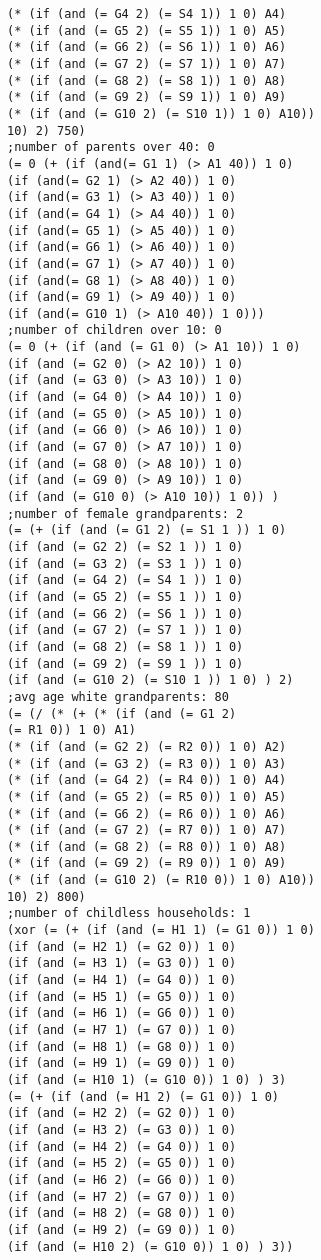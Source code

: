 \documentclass[5p,times,11pt]{elsarticle}
\begin{document}
\begin{verbatim}
(* (if (and (= G4 2) (= S4 1)) 1 0) A4)
(* (if (and (= G5 2) (= S5 1)) 1 0) A5)
(* (if (and (= G6 2) (= S6 1)) 1 0) A6)
(* (if (and (= G7 2) (= S7 1)) 1 0) A7)
(* (if (and (= G8 2) (= S8 1)) 1 0) A8)
(* (if (and (= G9 2) (= S9 1)) 1 0) A9)
(* (if (and (= G10 2) (= S10 1)) 1 0) A10))
10) 2) 750)
;number of parents over 40: 0
(= 0 (+ (if (and(= G1 1) (> A1 40)) 1 0)
(if (and(= G2 1) (> A2 40)) 1 0)
(if (and(= G3 1) (> A3 40)) 1 0)
(if (and(= G4 1) (> A4 40)) 1 0)
(if (and(= G5 1) (> A5 40)) 1 0)
(if (and(= G6 1) (> A6 40)) 1 0)
(if (and(= G7 1) (> A7 40)) 1 0)
(if (and(= G8 1) (> A8 40)) 1 0)
(if (and(= G9 1) (> A9 40)) 1 0)
(if (and(= G10 1) (> A10 40)) 1 0)))
;number of children over 10: 0
(= 0 (+ (if (and (= G1 0) (> A1 10)) 1 0)
(if (and (= G2 0) (> A2 10)) 1 0)
(if (and (= G3 0) (> A3 10)) 1 0)
(if (and (= G4 0) (> A4 10)) 1 0)
(if (and (= G5 0) (> A5 10)) 1 0)
(if (and (= G6 0) (> A6 10)) 1 0)
(if (and (= G7 0) (> A7 10)) 1 0)
(if (and (= G8 0) (> A8 10)) 1 0)
(if (and (= G9 0) (> A9 10)) 1 0)
(if (and (= G10 0) (> A10 10)) 1 0)) )
;number of female grandparents: 2
(= (+ (if (and (= G1 2) (= S1 1 )) 1 0)
(if (and (= G2 2) (= S2 1 )) 1 0)
(if (and (= G3 2) (= S3 1 )) 1 0)
(if (and (= G4 2) (= S4 1 )) 1 0)
(if (and (= G5 2) (= S5 1 )) 1 0)
(if (and (= G6 2) (= S6 1 )) 1 0)
(if (and (= G7 2) (= S7 1 )) 1 0)
(if (and (= G8 2) (= S8 1 )) 1 0)
(if (and (= G9 2) (= S9 1 )) 1 0)
(if (and (= G10 2) (= S10 1 )) 1 0) ) 2)
;avg age white grandparents: 80
(= (/ (* (+ (* (if (and (= G1 2)
(= R1 0)) 1 0) A1)
(* (if (and (= G2 2) (= R2 0)) 1 0) A2)
(* (if (and (= G3 2) (= R3 0)) 1 0) A3)
(* (if (and (= G4 2) (= R4 0)) 1 0) A4)
(* (if (and (= G5 2) (= R5 0)) 1 0) A5)
(* (if (and (= G6 2) (= R6 0)) 1 0) A6)
(* (if (and (= G7 2) (= R7 0)) 1 0) A7)
(* (if (and (= G8 2) (= R8 0)) 1 0) A8)
(* (if (and (= G9 2) (= R9 0)) 1 0) A9)
(* (if (and (= G10 2) (= R10 0)) 1 0) A10))
10) 2) 800)
;number of childless households: 1
(xor (= (+ (if (and (= H1 1) (= G1 0)) 1 0)
(if (and (= H2 1) (= G2 0)) 1 0)
(if (and (= H3 1) (= G3 0)) 1 0)
(if (and (= H4 1) (= G4 0)) 1 0)
(if (and (= H5 1) (= G5 0)) 1 0)
(if (and (= H6 1) (= G6 0)) 1 0)
(if (and (= H7 1) (= G7 0)) 1 0)
(if (and (= H8 1) (= G8 0)) 1 0)
(if (and (= H9 1) (= G9 0)) 1 0)
(if (and (= H10 1) (= G10 0)) 1 0) ) 3)
(= (+ (if (and (= H1 2) (= G1 0)) 1 0)
(if (and (= H2 2) (= G2 0)) 1 0)
(if (and (= H3 2) (= G3 0)) 1 0)
(if (and (= H4 2) (= G4 0)) 1 0)
(if (and (= H5 2) (= G5 0)) 1 0)
(if (and (= H6 2) (= G6 0)) 1 0)
(if (and (= H7 2) (= G7 0)) 1 0)
(if (and (= H8 2) (= G8 0)) 1 0)
(if (and (= H9 2) (= G9 0)) 1 0)
(if (and (= H10 2) (= G10 0)) 1 0) ) 3))

\end{verbatim}
\end{document}
